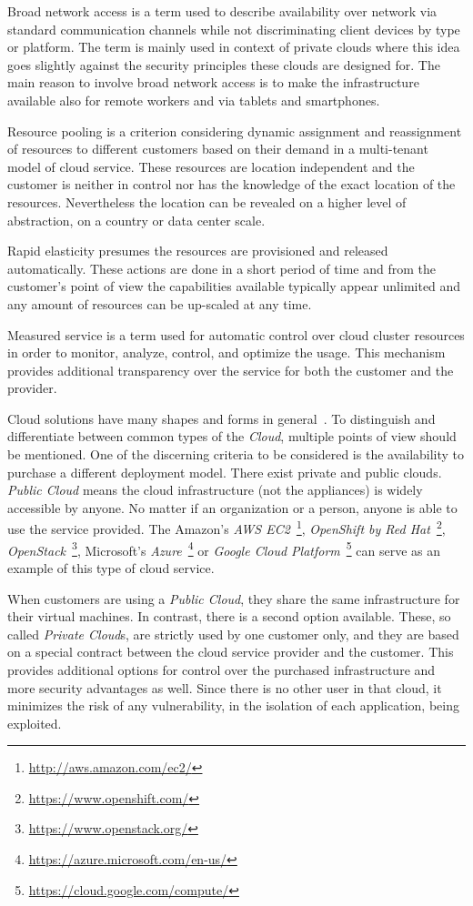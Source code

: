 Broad network access is a term used to describe availability over network via standard communication channels while not discriminating client devices by type or platform. The term is mainly used in context of private clouds where this idea goes slightly against the security principles these clouds are designed for. The main reason to involve broad network access is to make the infrastructure available also for remote workers and via tablets and smartphones.

Resource pooling is a criterion considering dynamic assignment and reassignment of resources to different customers based on their demand in a multi-tenant model of cloud service. These resources are location independent and the customer is neither in control nor has the knowledge of the exact location of the resources. Nevertheless the location can be revealed on a higher level of abstraction, on a country or data center scale.

Rapid elasticity presumes the resources are provisioned and released automatically. These actions are done in a short period of time and from the customer's point of view the capabilities available typically appear unlimited and any amount of resources can be up-scaled at any time.

Measured service is a term used for automatic control over cloud cluster resources in order to monitor, analyze, control, and optimize the usage. This mechanism provides additional transparency over the service for both the customer and the provider.

Cloud solutions have many shapes and forms in general~\cite{hassan}. To distinguish and differentiate between common types of the \emph{Cloud}, multiple points of view should be mentioned. One of the discerning criteria to be considered is the availability to purchase a different deployment model. There exist private and public clouds. \emph{Public Cloud} means the cloud infrastructure (not the appliances) is widely accessible by anyone. No matter if an organization or a person, anyone is able to use the service provided. The Amazon's \emph{AWS EC2}~\footnote{\url{http://aws.amazon.com/ec2/}}, \emph{OpenShift by Red Hat}~\footnote{\url{https://www.openshift.com/}},  \emph{OpenStack}~\footnote{\url{https://www.openstack.org/}}, Microsoft's \emph{Azure}~\footnote{\url{https://azure.microsoft.com/en-us/}} or \emph{Google Cloud Platform}~\footnote{\url{https://cloud.google.com/compute/}} can serve as an example of this type of cloud service.

When customers are using a \emph{Public Cloud}, they share the same infrastructure for their virtual machines. In contrast, there is a second option available. These, so called \emph{Private Cloud}s, are strictly used by one customer only, and they are based on a special contract between the cloud service provider and the customer. This provides additional options for control over the purchased infrastructure and more security advantages as well. Since there is no other user in that cloud, it minimizes the risk of any vulnerability, in the isolation of each application, being exploited.

